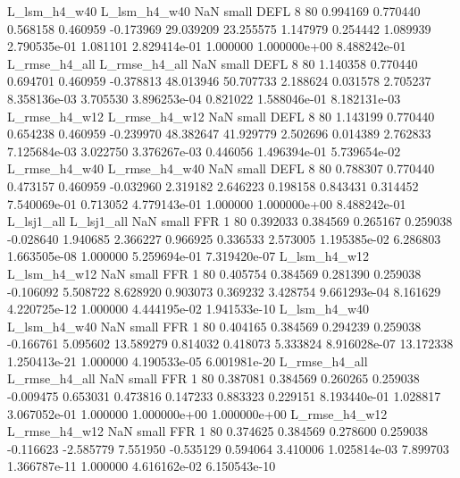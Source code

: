  L_lsm_h4_w40  L_lsm_h4_w40                   NaN      small     DEFL                 8 80 0.994169       0.770440 0.568158       0.460959   -0.173969     29.039209     23.255575     1.147979       0.254442  1.089939 2.790535e-01     1.081101   2.829414e-01            1.000000    1.000000e+00        8.488242e-01
L_rmse_h4_all L_rmse_h4_all                   NaN      small     DEFL                 8 80 1.140358       0.770440 0.694701       0.460959   -0.378813     48.013946     50.707733     2.188624       0.031578  2.705237 8.358136e-03     3.705530   3.896253e-04            0.821022    1.588046e-01        8.182131e-03
L_rmse_h4_w12 L_rmse_h4_w12                   NaN      small     DEFL                 8 80 1.143199       0.770440 0.654238       0.460959   -0.239970     48.382647     41.929779     2.502696       0.014389  2.762833 7.125684e-03     3.022750   3.376267e-03            0.446056    1.496394e-01        5.739654e-02
L_rmse_h4_w40 L_rmse_h4_w40                   NaN      small     DEFL                 8 80 0.788307       0.770440 0.473157       0.460959   -0.032960      2.319182      2.646223     0.198158       0.843431  0.314452 7.540069e-01     0.713052   4.779143e-01            1.000000    1.000000e+00        8.488242e-01
   L_lsj1_all    L_lsj1_all                   NaN      small      FFR                 1 80 0.392033       0.384569 0.265167       0.259038   -0.028640      1.940685      2.366227     0.966925       0.336533  2.573005 1.195385e-02     6.286803   1.663505e-08            1.000000    5.259694e-01        7.319420e-07
 L_lsm_h4_w12  L_lsm_h4_w12                   NaN      small      FFR                 1 80 0.405754       0.384569 0.281390       0.259038   -0.106092      5.508722      8.628920     0.903073       0.369232  3.428754 9.661293e-04     8.161629   4.220725e-12            1.000000    4.444195e-02        1.941533e-10
 L_lsm_h4_w40  L_lsm_h4_w40                   NaN      small      FFR                 1 80 0.404165       0.384569 0.294239       0.259038   -0.166761      5.095602     13.589279     0.814032       0.418073  5.333824 8.916028e-07    13.172338   1.250413e-21            1.000000    4.190533e-05        6.001981e-20
L_rmse_h4_all L_rmse_h4_all                   NaN      small      FFR                 1 80 0.387081       0.384569 0.260265       0.259038   -0.009475      0.653031      0.473816     0.147233       0.883323  0.229151 8.193440e-01     1.028817   3.067052e-01            1.000000    1.000000e+00        1.000000e+00
L_rmse_h4_w12 L_rmse_h4_w12                   NaN      small      FFR                 1 80 0.374625       0.384569 0.278600       0.259038   -0.116623     -2.585779      7.551950    -0.535129       0.594064  3.410006 1.025814e-03     7.899703   1.366787e-11            1.000000    4.616162e-02        6.150543e-10
